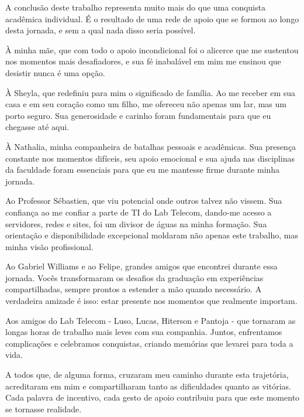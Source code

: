 \begin{agradecimentos}
A conclusão deste trabalho representa muito mais do que uma conquista acadêmica individual. É o resultado de uma rede de apoio que se formou ao longo desta jornada, e sem a qual nada disso seria possível.

À minha mãe, que com todo o apoio incondicional foi o alicerce que me sustentou nos momentos mais desafiadores, e sua fé inabalável em mim me ensinou que desistir nunca é uma opção.

À Sheyla, que redefiniu para mim o significado de família. Ao me receber em sua casa e em seu coração como um filho, me ofereceu não apenas um lar, mas um porto seguro. Sua generosidade e carinho foram fundamentais para que eu chegasse até aqui.

À Nathalia, minha companheira de batalhas pessoais e acadêmicas. Sua presença constante nos momentos difíceis, seu apoio emocional e sua ajuda nas disciplinas da faculdade foram essenciais para que eu me mantesse firme durante minha jornada.

Ao Professor Sébastien, que viu potencial onde outros talvez não vissem. Sua confiança ao me confiar a parte de TI do Lab Telecom, dando-me acesso a servidores, redes e sites, foi um divisor de águas na minha formação. Sua orientação e disponibilidade excepcional moldaram não apenas este trabalho, mas minha visão profissional.

Ao Gabriel Williams e ao Felipe, grandes amigos que encontrei durante essa jornada. Vocês transformaram os desafios da graduação em experiências compartilhadas, sempre prontos a estender a mão quando necessário. A verdadeira amizade é isso: estar presente nos momentos que realmente importam.

Aos amigos do Lab Telecom - Luso, Lucas, Hiterson e Pantoja - que tornaram as longas horas de trabalho mais leves com sua companhia. Juntos, enfrentamos complicações e celebramos conquistas, criando memórias que levarei para toda a vida.

A todos que, de alguma forma, cruzaram meu caminho durante esta trajetória, acreditaram em mim e compartilharam tanto as dificuldades quanto as vitórias. Cada palavra de incentivo, cada gesto de apoio contribuiu para que este momento se tornasse realidade.

\end{agradecimentos}
